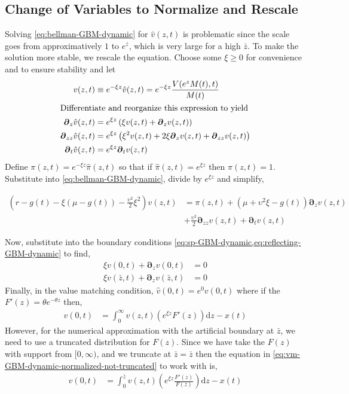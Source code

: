 \documentclass[11pt]{article}
\newcommand{\D}[1][]{\ensuremath{\boldsymbol{\partial}_{#1}}}
\newcommand{\diff}{\ensuremath{\mathrm{d}}}
\begin{document}
\subsection{Change of Variables to Normalize and Rescale}\label{eq:simple-rescale}
Solving \cref{eq:bellman-GBM-dynamic} for $\hat{v}(z,t)$ is problematic since the scale goes from approximatively $1$ to $e^{\bar{z}}$, which is very large for a high $\bar{z}$.  To make the solution more stable, we rescale the equation.  Choose some $\xi \geq 0$ for convenience and to ensure stability and let
\begin{align}
	v(z,t) &\equiv e^{-\xi z}\hat{v}(z,t) = e^{-\xi z}\frac{V(e^z M(t),t)}{M(t)}\\
	\intertext{Differentiate and reorganize this expression to yield}
	\D[z]\hat{v}(z,t) &= e^{\xi z}\left(\xi v(z,t) + \D[z]v(z,t) \right)\\
	\D[zz]\hat{v}(z,t) &= e^{\xi z}\left(\xi^{2} v(z,t) + 2 \xi\D[z]v(z,t) + \D[zz]v(z,t)  \right)\\	
	\D[t]\hat{v}(z,t) &= e^{\xi z} \D[t]v(z,t)
\end{align}
Define $\pi(z,t) = e^{-\xi z}\hat{\pi}(z,t)$ so that if $\hat{\pi}(z,t) = e^{\xi z}$ then $\pi(z,t) = 1$.  Substitute into \cref{eq:bellman-GBM-dynamic}, divide by $e^{\xi z}$ and simplify,

\begin{align}
	\left(r - g(t)- \xi(\mu-g(t)) - \frac{\upsilon^2}{2}\xi^2\right)  v(z,t) &= \pi(z,t) + (\mu+ \upsilon^2\xi - g(t)) \D[z]v(z,t) \nonumber \\ &+ \frac{\upsilon^2}{2} \D[zz]v(z,t) + \D[t]v(z,t)  \label{eq:bellman-GBM-dynamic-normalized}
\end{align}

Now, substitute into the boundary conditions \cref{eq:sp-GBM-dynamic,eq:reflecting-GBM-dynamic} to find,
\begin{align}
	\xi v(0,t) + \D[z]v(0,t ) &= 0\label{eq:new-BC1}\\
	\xi v(\bar{z},t) + \D[z]v(\bar{z},t) &= 0\label{eq:new-BC2}
\end{align}	
Finally, in the value matching condition, $\hat{v}(0,t) = e^{0} v(0,t)$ where if the $F'(z) = \theta e^{-\theta z}$ then,
\begin{align}
	 v(0,t) &= \int_{0}^{\infty}  v(z,t) \left(e^{\xi z} F'(z)\right) \diff z - x(t)\label{eq:vm-GBM-dynamic-normalized-not-truncated}
\end{align}	
However, for the numerical approximation with the artificial boundary at $\bar{z}$, we need to use a truncated distribution for $F(z)$.  Since we have take the $F(z)$ with support from $[0,\infty)$, and we truncate at $\bar{z} = \bar{z}$ then the equation in \cref{eq:vm-GBM-dynamic-normalized-not-truncated} to work with is,
\begin{align}
	 v(0,t) &= \int_{0}^{\bar{z}}  v(z,t) \left(e^{\xi z} \frac{F'(z)}{F(\bar{z})}\right) \diff z - x(t)\label{eq:vm-GBM-dynamic-normalized}
\end{align}
\end{document}
